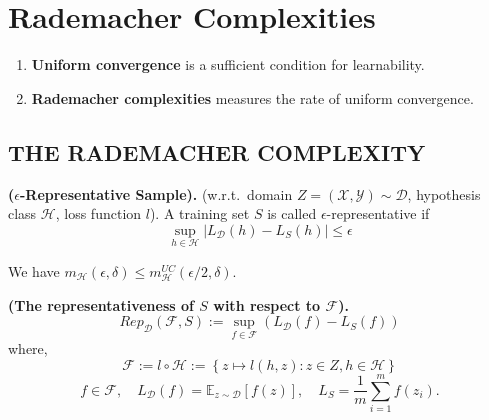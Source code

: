 
\section{Rademacher Complexities}%
\label{sec:rademacher_complexities_w_}

\begin{enumerate}
    \item \textbf{Uniform convergence} is a sufficient condition for learnability.
    \item \textbf{Rademacher complexities} measures the rate of uniform convergence.
\end{enumerate}

\subsection{THE RADEMACHER COMPLEXITY}%
\label{sub:the_rademacher_complexity}

\begin{definition}
    \textbf{($ \epsilon$-Representative Sample).}
    (w.r.t.\ domain $ Z = (\mathcal{X}, \mathcal{Y}) \sim \mathcal{D}$, hypothesis class $\mathcal{H}$, loss function $ l $).
    A training set $ S $ is called $ \epsilon $-representative if
    \[
        \sup_{h\in \mathcal{H}} \left| L_ \mathcal{D}(h) - L_S(h) \right| \le \epsilon
    \]
\end{definition}

We have $ m_\mathcal{H}(\epsilon, \delta) \le m^{UC}_\mathcal{H}(\epsilon/2, \delta)$.

\begin{definition}
    \textbf{(The representativeness of $ S $ with respect to $ \mathcal{F} $). }
    \begin{equation}
        Rep_ \mathcal{D}(\mathcal{F}, S) := \sup_{f \in \mathcal{F}} (L_ \mathcal{D}(f) - L_S (f))
    \end{equation}
    where,
    \[
        \mathcal{F} := l \circ \mathcal{H} := \left\{ z \mapsto l(h,z) : z \in Z, h \in \mathcal{H} \right\}
    \]
    \[
        f\in \mathcal{F},\quad
        L_ \mathcal{D}(f) = \mathbb{E}_{z\sim \mathcal{D}} [f(z)],\quad
        L_S = \frac{1}{m} \sum^{m}_{i=1} f(z_i).
    \]
\end{definition}

